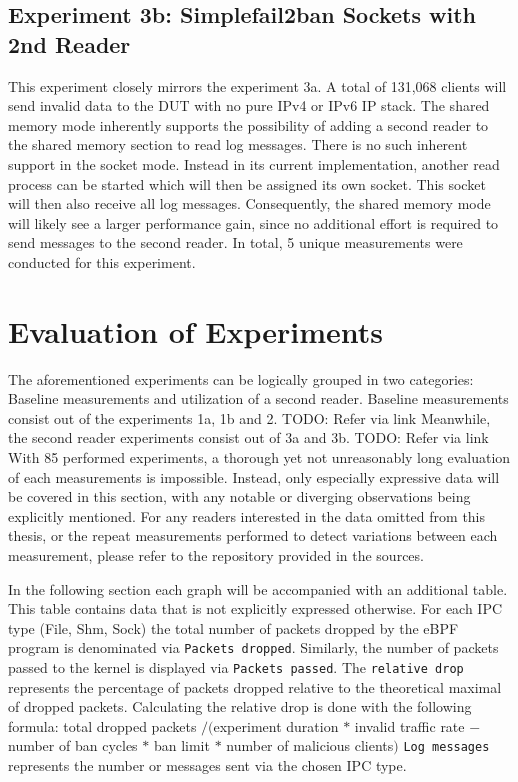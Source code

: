 \subsection{Experiment 3b: Simplefail2ban Sockets with 2nd Reader}
This experiment closely mirrors the experiment 3a.
A total of 131,068 clients will send invalid data to the DUT with no pure IPv4 or IPv6 IP stack.
The shared memory mode inherently supports the possibility of adding a second reader to the shared memory section to read log messages.
There is no such inherent support in the socket mode.
Instead in its current implementation, another read process can be started which will then be assigned its own socket.
This socket will then also receive all log messages.
Consequently, the shared memory mode will likely see a larger performance gain, since no additional effort is required to send messages to the second reader. 
In total, 5 unique measurements were conducted for this experiment.

\section{Evaluation of Experiments}
The aforementioned experiments can be logically grouped in two categories\@: Baseline measurements and utilization of a second reader.
Baseline measurements consist out of the experiments 1a, 1b and 2. TODO: Refer via link
Meanwhile, the second reader experiments consist out of 3a and 3b. TODO: Refer via link
With 85 performed experiments, a thorough yet not unreasonably long evaluation of each measurements is impossible.
Instead, only especially expressive data will be covered in this section, with any notable or diverging observations being explicitly mentioned.
For any readers interested in the data omitted from this thesis, or the repeat measurements performed to detect variations between each measurement, please refer to the repository provided in the sources\cite{git:repoOfThesis}.

In the following section each graph will be accompanied with an additional table.
This table contains data that is not explicitly expressed otherwise.
For each IPC type (File, Shm, Sock) the total number of packets dropped by the eBPF program is denominated via \texttt{Packets dropped}.
Similarly, the number of packets passed to the kernel is displayed via \texttt{Packets passed}.
The \texttt{relative drop} represents the percentage of packets dropped relative to the theoretical maximal of dropped packets.
Calculating the relative drop is done with the following formula:
\noindent
total dropped packets $/ ($experiment duration $*$ invalid traffic rate $-$ number of ban cycles $*$ ban limit $*$ number of malicious clients$)$
\noindent
\texttt{Log messages} represents the number or messages sent via the chosen IPC type.

